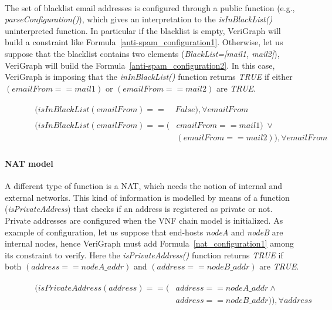 \\
The set of blacklist email addresses is configured through a public function (e.g., \textit{parseConfiguration()}), which gives an interpretation to the \textit{isInBlackList()} uninterpreted function. In particular if the blacklist is empty, VeriGraph will build a constraint like Formula~\ref{anti-spam_configuration1}. Otherwise, let us suppose that the blacklist contains two elements (\textit{BlackList=[mail1, mail2]}), VeriGraph will build the Formula~\ref{anti-spam_configuration2}. In this case, VeriGraph is imposing that the \textit{inInBlackList()} function returns \textit{TRUE} if either \textit{$(emailFrom == mail1)$} or \textit{$(emailFrom == mail2)$} are \textit{TRUE}.
	\begin{figure}[h]
		{\footnotesize
			\begin{subequations}
				\begin{align}
					\begin{split}
						\label{anti-spam_configuration1}
						(isInBlackList(emailFrom) == \;& False), \forall emailFrom
					\end{split} \\
					\begin{split}
						\label{anti-spam_configuration2}
						(isInBlackList(emailFrom) == (& emailFrom == mail1) \; \vee \\
						& (emailFrom == mail2)), \forall emailFrom
					\end{split}
				\end{align}
			\end{subequations}
		}%
	\end{figure}


\paragraph{NAT model}
A different type of function is a NAT, which needs the notion of internal and external networks. This kind of information is modelled by means of a function (\textit{isPrivateAddress}) that checks if an address is registered as private or not. Private addresses are configured when the VNF chain model is initialized. As example of configuration, let us suppose that end-hosts \textit{nodeA} and \textit{nodeB} are internal nodes, hence VeriGraph must add Formula~\ref{nat_configuration1} among its constraint to verify. Here the \textit{isPrivateAddress()} function returns \textit{TRUE} if both \textit{$( address == nodeA\_addr)$} and \textit{$(address == nodeB\_addr)$} are \textit{TRUE}.
\begin{figure}[h]
	{\footnotesize
		\begin{subequations}
			\begin{align}
				\begin{split}
					\label{nat_configuration1}
					(isPrivateAddress(address) == (& address == nodeA\_addr \wedge \\
					& address == nodeB\_addr)), \forall address
				\end{split}
			\end{align}
		\end{subequations}
	}%
\end{figure}

